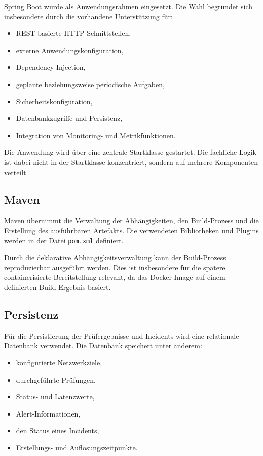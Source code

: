 Spring Boot wurde als Anwendungsrahmen eingesetzt. Die Wahl begründet sich insbesondere durch die vorhandene Unterstützung für:

\begin{itemize}
    \item REST-basierte HTTP-Schnittstellen,
    \item externe Anwendungskonfiguration,
    \item Dependency Injection,
    \item geplante beziehungsweise periodische Aufgaben,
    \item Sicherheitskonfiguration,
    \item Datenbankzugriffe und Persistenz,
    \item Integration von Monitoring- und Metrikfunktionen.
\end{itemize}

Die Anwendung wird über eine zentrale Startklasse gestartet. Die fachliche Logik ist dabei nicht in der Startklasse konzentriert, sondern auf mehrere Komponenten verteilt.

\subsection{Maven}
\label{subsec:maven}

Maven übernimmt die Verwaltung der Abhängigkeiten, den Build-Prozess und die Erstellung des ausführbaren Artefakts. Die verwendeten Bibliotheken und Plugins werden in der Datei \texttt{pom.xml} definiert.

Durch die deklarative Abhängigkeitsverwaltung kann der Build-Prozess reproduzierbar ausgeführt werden. Dies ist insbesondere für die spätere containerisierte Bereitstellung relevant, da das Docker-Image auf einem definierten Build-Ergebnis basiert.

\subsection{Persistenz}
\label{subsec:persistenz-technologie}

Für die Persistierung der Prüfergebnisse und Incidents wird eine relationale Datenbank verwendet. Die Datenbank speichert unter anderem:

\begin{itemize}
    \item konfigurierte Netzwerkziele,
    \item durchgeführte Prüfungen,
    \item Status- und Latenzwerte,
    \item Alert-Informationen,
    \item den Status eines Incidents,
    \item Erstellungs- und Auflösungszeitpunkte.
\end{itemize}

